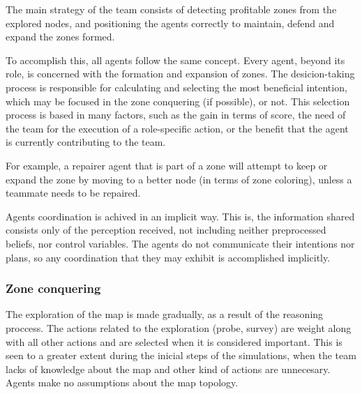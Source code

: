 \documentclass{llncs2e/llncs}
\begin{document}
    The main strategy of the team consists of detecting profitable zones from the 
    explored nodes, and positioning the agents correctly to maintain, defend 
    and expand the zones formed. 
    
    To accomplish this, all agents follow the same concept. Every agent, beyond 
    its role, is concerned with the formation and expansion of zones.
    The desicion-taking process is responsible for calculating and selecting the
    most beneficial intention, which may be focused in the zone conquering (if possible),
    or not.
    This selection process is based in many factors, such as the gain in terms 
    of score, the need of the team for the execution of a role-specific action, or
    the benefit that the agent is currently contributing to the team. 
    
    
    For example, a repairer agent that is part of a zone will attempt to keep or
    expand the zone by moving to a better node (in terms of zone coloring), 
    unless a teammate needs to be repaired.
    
    Agents coordination is achived in an implicit way. This is, the information
    shared consists only of the perception received, not including neither 
    preprocessed beliefs, nor control variables. The agents do not communicate
    their intentions nor plans, so any coordination that they may exhibit is 
    accomplished implicitly.
       
\subsubsection{Zone conquering}
    
    The exploration of the map is made gradually, as a result of the reasoning 
    proccess. The actions related to the exploration (probe, survey) are weight 
    along with all other actions and are selected when it is considered important. 
    This is seen to a greater extent during the inicial steps of the simulations, 
    when the team lacks of knowledge about the map and other kind of actions are 
    unnecesary. Agents make no assumptions about the map topology.
\end{document}
